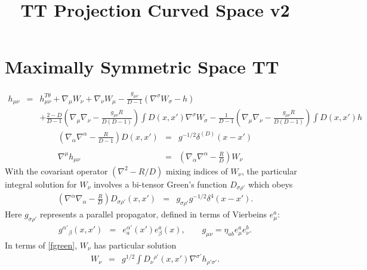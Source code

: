 \documentclass[10pt,letterpaper]{article}
\title{TT Projection Curved Space v2}
\date{}
\numberwithin{equation}{section}
\begin{document}
 
\maketitle
\noindent 
\section{Maximally Symmetric Space TT}
\begin{eqnarray}
h_{\mu\nu} &=& h_{\mu\nu}^{T\theta} + \nabla_\mu W_\nu + \nabla_\nu W_\mu - \frac{g_{\mu\nu}}{D-1}(\nabla^\sigma W_\sigma - h)
\nonumber\\
&& +\frac{2-D}{D-1}\left( \nabla_\mu\nabla_\nu -\frac{ g_{\mu\nu}R}{D(D-1)}\right) \int D(x,x') \nabla^\sigma W_\sigma
-\frac{1}{D-1}\left( \nabla_\mu\nabla_\nu -\frac{g_{\mu\nu}R}{D(D-1)}\right) \int D(x,x') h
\label{decomphmax}
\end{eqnarray}
\begin{eqnarray}
\left( \nabla_\alpha \nabla^\alpha - \frac{R}{D-1}\right)D(x,x') &=& g^{-1/2}\delta^{(D)} (x-x')
\\ \nonumber\\
\nabla^\mu h_{\mu\nu} &=& \left( \nabla_\alpha\nabla^\alpha-\frac{R}{D} \right) W_\nu
\end{eqnarray}
With the covariant operator $(\nabla^2-R/D)$ mixing indices of $W_\nu$, the particular integral solution for $W_\nu$ involves a bi-tensor Green's function $D_{\sigma\rho'}$ which obeys
\begin{eqnarray}
\left( \nabla^\alpha\nabla_\alpha -\frac{R}{D}\right) D_{\sigma\rho'}(x,x') &=& g_{\sigma\rho'}g^{-1/2} \delta^4(x-x').
\label{fgreen}
\end{eqnarray}
Here $g_{\sigma\rho'}$ represents a parallel propagator, defined in terms of Vierbeins $e_\mu^a$:
\begin{eqnarray}
g^{\alpha'}{}_{\beta}(x,x') &=& e^{\alpha'}_a(x') e_{\beta}^a(x),\qquad g_{\mu\nu} = \eta_{ab}e_{\mu}^ae_\nu^b.
\end{eqnarray}
In terms of \eqref{fgreen}, $W_\nu$ has particular solution
\begin{eqnarray}
W_\nu &=& g^{1/2}\int D_\nu{}^{\rho'}(x,x')\nabla^{\sigma'}h_{\rho'\sigma'}.
\end{eqnarray}
%
%
\end{document}
